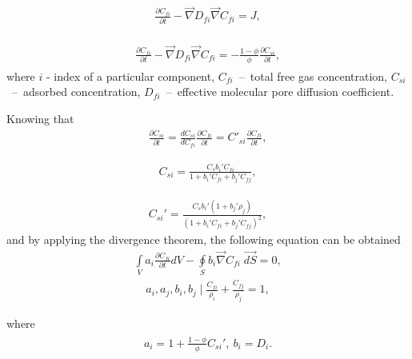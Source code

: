 \documentclass[a4paper,14pt,english]{extreport}
\begin{document}
\begin{eqnarray}
\begin{gathered}
\label{eq:langm_only_free_diffusivity_differential}
\frac{\partial C_{fi}}{\partial t} - \vec{\nabla} D_{fi} \vec{\nabla}C_{fi} = J,
\end{gathered}
\end{eqnarray}

\begin{eqnarray}
\begin{gathered}
\label{eq:langm_only_adsorbed_diffusivity_differential}
\frac{\partial C_{fi}}{\partial t} - \vec{\nabla} D_{fi} \vec{\nabla}C_{fi} = - \frac{1 - \phi}{\phi} \frac{\partial C_{si}}{\partial t},
\end{gathered}
\end{eqnarray}
where $i$ - index of  a particular component, $C_{fi}$~--~total free gas concentration, $C_{si}$~--~adsorbed concentration, $D_{fi}$~--~effective molecular pore diffusion coefficient.

Knowing that
\begin{eqnarray}
\label{eq:langm_only_chain_rule_timeder}
\frac{\partial C_{si}}{\partial t} =  \frac{dC_{si}}{dC_{fi}}\frac{\partial C_{fi}}{\partial t} = C'_{si}\frac{\partial C_{fi}}{\partial t},
\end{eqnarray}

\begin{eqnarray}
\label{eq:langm_only_adsorbed_conc}
C_{si} =  \frac{C_{s} b_{i}' C_{fi}}{1+b_{i}'C_{fi}+b_{j}'C_{fj}},
\end{eqnarray}

\begin{eqnarray}
\label{eq:langm_only_adsorbed_conc_deriv}
C_{si}' =  \frac{C_{s}b_{i}' \left(1+b_{j}'\rho_{j}\right)}{\left(1+b_{i}'C_{fi}+b_{j}'C_{fj}\right)^2},
\end{eqnarray}
and by applying the divergence theorem, the following equation can be obtained
\begin{eqnarray}
\label{eq:langm_only_diffusivity_simplified_integral}
\int \limits_{V} a_{i} \frac{\partial C_{fi}}{\partial t} dV - \oint \limits_{S} b_{i} \vec{\nabla}C_{fi} \; \vec{dS} = 0,
\end{eqnarray}
\begin{eqnarray}
\label{eq:langm_only_diffusivity_densities}
a_{i}, a_{j}, b_{i}, b_{j} \mid \frac{C_{fi}}{\rho_i} + \frac{C_{fj}}{\rho_j} = 1,
\end{eqnarray} 

where
\begin{eqnarray}
\begin{gathered}
\label{eq:langm_only_diffusivity_a_b_coeffs}
a_{i}  =  1+\frac{1 - \phi}{\phi}C_{si}', \: b_{i}  = D_{i}.
\end{gathered}
\end{eqnarray}
\end{document}
